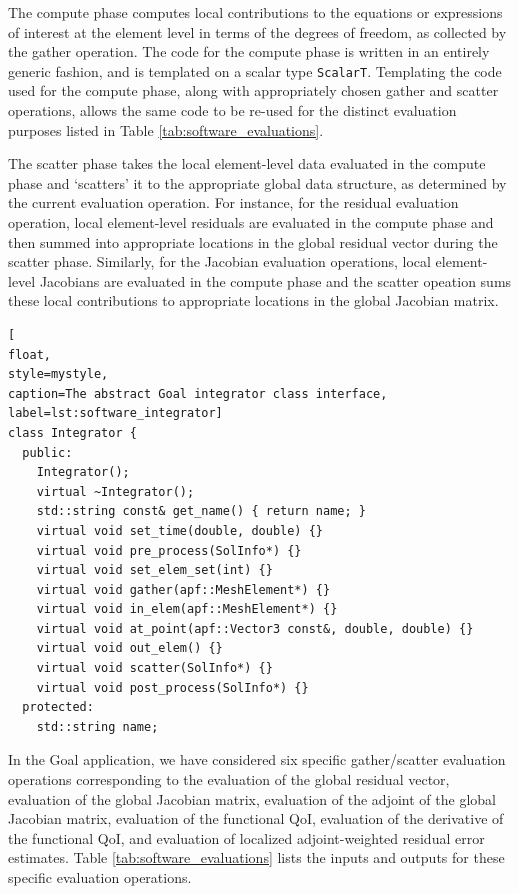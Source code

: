 The compute phase computes local contributions to the equations or
expressions of interest at the element level in terms of the degrees
of freedom, as collected by the gather operation. The code for the
compute phase is written in an entirely generic fashion, and is templated
on a scalar type \texttt{ScalarT}. Templating the code used for the
compute phase, along with appropriately chosen gather and scatter
operations, allows the same code to be re-used for the distinct
evaluation purposes listed in Table \ref{tab:software_evaluations}.

The scatter phase takes the local element-level data
evaluated in the compute phase and `scatters' it to the appropriate
global data structure, as determined by the current evaluation operation.
For instance, for the residual evaluation operation, local element-level
residuals are evaluated in the compute phase and then summed into
appropriate locations in the global residual vector during the scatter
phase. Similarly, for the Jacobian evaluation operations, local element-level
Jacobians are evaluated in the compute phase and the scatter opeation
sums these local contributions to appropriate locations in the global
Jacobian matrix.

\begin{lstlisting}[
float,
style=mystyle,
caption=The abstract Goal integrator class interface,
label=lst:software_integrator]
class Integrator {
  public:
    Integrator();
    virtual ~Integrator();
    std::string const& get_name() { return name; }
    virtual void set_time(double, double) {}
    virtual void pre_process(SolInfo*) {}
    virtual void set_elem_set(int) {}
    virtual void gather(apf::MeshElement*) {}
    virtual void in_elem(apf::MeshElement*) {}
    virtual void at_point(apf::Vector3 const&, double, double) {}
    virtual void out_elem() {}
    virtual void scatter(SolInfo*) {}
    virtual void post_process(SolInfo*) {}
  protected:
    std::string name;
\end{lstlisting}

In the Goal application, we have considered six specific gather/scatter
evaluation operations corresponding to the evaluation of the global
residual vector, evaluation of the global Jacobian matrix, evaluation
of the adjoint of the global Jacobian matrix, evaluation of the
functional QoI, evaluation of the derivative of the functional QoI,
and evaluation of localized adjoint-weighted residual error estimates.
Table \ref{tab:software_evaluations} lists the inputs and outputs for
these specific evaluation operations.

